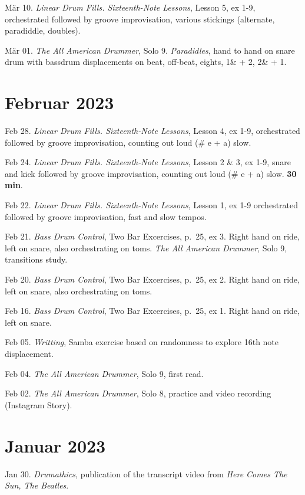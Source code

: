 \documentclass[
]{book}
\begin{document}
Mär 10. \emph{Linear Drum Fills. Sixteenth-Note Lessons}, Lesson 5, ex 1-9, orchestrated followed by groove improvisation, various stickings (alternate, paradiddle, doubles).

Mär 01. \emph{The All American Drummer}, Solo 9. \emph{Paradidles}, hand to hand on snare drum with bassdrum displacements on beat, off-beat, eights, 1\& + 2, 2\& + 1.

\hypertarget{februar-2023}{%
\section*{Februar 2023}\label{februar-2023}}

Feb 28. \emph{Linear Drum Fills. Sixteenth-Note Lessons}, Lesson 4, ex 1-9, orchestrated followed by groove improvisation, counting out loud (\# e + a) slow.

Feb 24. \emph{Linear Drum Fills. Sixteenth-Note Lessons}, Lesson 2 \& 3, ex 1-9, snare and kick followed by groove improvisation, counting out loud (\# e + a) slow. \textbf{30 min}.

Feb 22. \emph{Linear Drum Fills. Sixteenth-Note Lessons}, Lesson 1, ex 1-9 orchestrated followed by groove improvisation, fast and slow tempos.

Feb 21. \emph{Bass Drum Control}, Two Bar Excercises, p.~25, ex 3. Right hand on ride, left on snare, also orchestrating on toms. \emph{The All American Drummer}, Solo 9, transitions study.

Feb 20. \emph{Bass Drum Control}, Two Bar Excercises, p.~25, ex 2. Right hand on ride, left on snare, also orchestrating on toms.

Feb 16. \emph{Bass Drum Control}, Two Bar Excercises, p.~25, ex 1. Right hand on ride, left on snare.

Feb 05. \emph{Writting}, Samba exercise based on randomness to explore 16th note displacement.

Feb 04. \emph{The All American Drummer}, Solo 9, first read.

Feb 02. \emph{The All American Drummer}, Solo 8, practice and video recording (Instagram Story).

\hypertarget{januar-2023}{%
\section*{Januar 2023}\label{januar-2023}}

Jan 30. \emph{Drumathics}, publication of the transcript video from \emph{Here Comes The Sun, The Beatles}.
\end{document}
